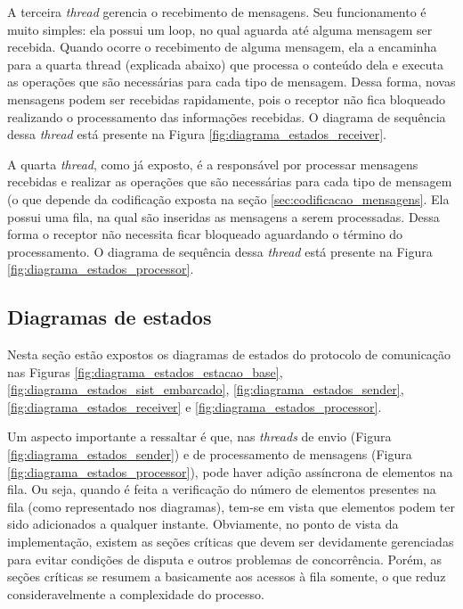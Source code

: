 A terceira \textit{thread} gerencia o recebimento de mensagens. Seu funcionamento é muito simples: ela possui um loop, no qual aguarda até alguma mensagem ser recebida. Quando ocorre o recebimento de alguma mensagem, ela a encaminha para a quarta thread (explicada abaixo) que processa o conteúdo dela e executa as operações que são necessárias para cada tipo de mensagem. Dessa forma, novas mensagens podem ser recebidas rapidamente, pois o receptor não fica bloqueado realizando o processamento das informações recebidas. O diagrama de sequência dessa \textit{thread} está presente na Figura \ref{fig:diagrama_estados_receiver}.

A quarta \textit{thread}, como já exposto, é a responsável por processar mensagens recebidas e realizar as operações que são necessárias para cada tipo de mensagem (o que depende da codificação exposta na seção \ref{sec:codificacao_mensagens}. Ela possui uma fila, na qual são inseridas as mensagens a serem processadas. Dessa forma o receptor não necessita ficar bloqueado aguardando o término do processamento. O diagrama de sequência dessa \textit{thread} está presente na Figura \ref{fig:diagrama_estados_processor}.

\subsection{Diagramas de estados}

Nesta seção estão expostos os diagramas de estados do protocolo de comunicação nas Figuras \ref{fig:diagrama_estados_estacao_base}, \ref{fig:diagrama_estados_sist_embarcado}, \ref{fig:diagrama_estados_sender}, \ref{fig:diagrama_estados_receiver} e \ref{fig:diagrama_estados_processor}.

Um aspecto importante a ressaltar é que, nas \textit{threads} de envio (Figura \ref{fig:diagrama_estados_sender}) e de processamento de mensagens (Figura \ref{fig:diagrama_estados_processor}), pode haver adição assíncrona de elementos na fila. Ou seja, quando é feita a verificação do número de elementos presentes na fila (como representado nos diagramas), tem-se em vista que elementos podem ter sido adicionados a qualquer instante. Obviamente, no ponto de vista da implementação, existem as seções críticas que devem ser devidamente gerenciadas para evitar condições de disputa e outros problemas de concorrência. Porém, as seções críticas se resumem a basicamente aos acessos à fila somente, o que reduz consideravelmente a complexidade do processo.


